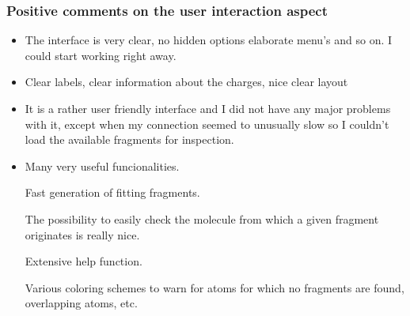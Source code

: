 \subsubsection{Positive comments on the user interaction aspect}
\begin{itemize}
\item The interface is very clear, no hidden options elaborate menu's and so on. I could start working right away.

\item Clear labels, clear information about the charges, nice clear layout

\item It is a rather user friendly interface and I did not have any major problems with it, except when my connection seemed to unusually slow so I couldn't load the available fragments for inspection.

\item Many very useful funcionalities.


Fast generation of fitting fragments.


The possibility to easily check the molecule from which a given fragment originates is really nice.


Extensive help function.


Various coloring schemes to warn for atoms for which no fragments are found, overlapping atoms, etc.

\end{itemize}


